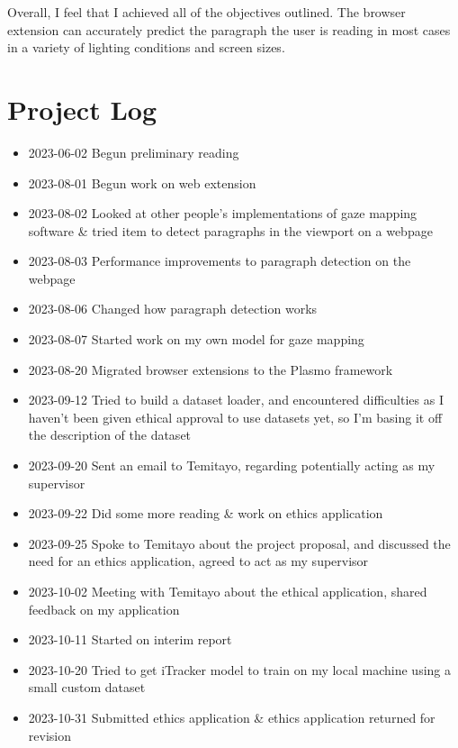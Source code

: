 \documentclass{report}
\begin{document}
Overall, I feel that I achieved all of the objectives outlined. The browser extension can accurately predict the paragraph the user is reading in most cases in a variety of lighting conditions and screen sizes. 


\nocite{*}
\printbibliography

\appendix 

\chapter{Project Log}

\begin{itemize}
    \item 2023-06-02 Begun preliminary reading 
    \item 2023-08-01 Begun work on web extension 
    \item 2023-08-02 Looked at other people's implementations of gaze mapping software \& tried item to detect paragraphs in the viewport on a webpage 
    \item 2023-08-03 Performance improvements to paragraph detection on the webpage 
    \item 2023-08-06 Changed how paragraph detection works 
    \item 2023-08-07 Started work on my own model for gaze mapping 
    \item 2023-08-20 Migrated browser extensions to the Plasmo framework 
    \item 2023-09-12 Tried to build a dataset loader, and encountered difficulties as I haven't been given ethical approval to use datasets yet, so I'm basing it off the description of the dataset
    \item 2023-09-20 Sent an email to Temitayo, regarding potentially acting as my supervisor
    \item 2023-09-22 Did some more reading \& work on ethics application  
    \item 2023-09-25 Spoke to Temitayo about the project proposal, and discussed the need for an ethics application, agreed to act as my supervisor 
    \item 2023-10-02 Meeting with Temitayo about the ethical application, shared feedback on my application 
    \item 2023-10-11 Started on interim report 
    \item 2023-10-20 Tried to get iTracker model to train on my local machine using a small custom dataset 
    \item 2023-10-31 Submitted ethics application \& ethics application returned for revision

\end{itemize}
\end{document}
